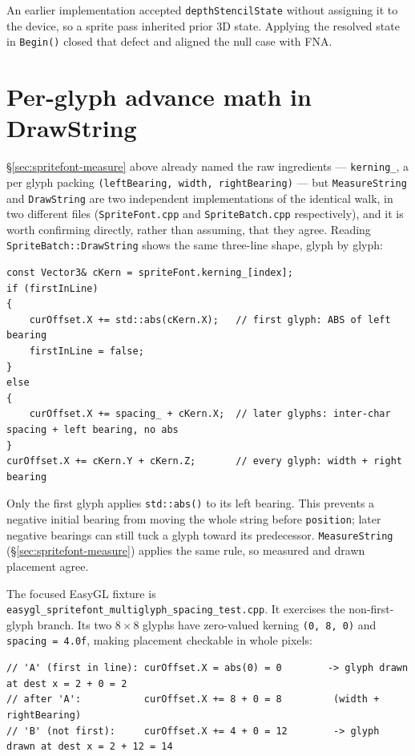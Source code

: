 \begin{historynote}
An earlier implementation accepted \texttt{depthStencilState} without assigning it to the
device, so a sprite pass inherited prior 3D state. Applying the resolved state in
\texttt{Begin()} closed that defect and aligned the null case with FNA.
\end{historynote}

\section{Per-glyph advance math in DrawString}
\label{sec:spritebatch-drawstring-advance}

\S\ref{sec:spritefont-measure} above already named the raw ingredients --- \texttt{kerning\_},
a  per glyph packing \texttt{(leftBearing, width, rightBearing)} --- but
\texttt{MeasureString} and \texttt{DrawString} are two independent implementations of the
identical walk, in two different files (\texttt{SpriteFont.cpp} and \texttt{SpriteBatch.cpp}
respectively), and it is worth confirming directly, rather than assuming, that they agree.
Reading \texttt{SpriteBatch::DrawString} shows the same three-line shape, glyph by glyph:

\begin{lstlisting}
const Vector3& cKern = spriteFont.kerning_[index];
if (firstInLine)
{
    curOffset.X += std::abs(cKern.X);   // first glyph: ABS of left bearing
    firstInLine = false;
}
else
{
    curOffset.X += spacing_ + cKern.X;  // later glyphs: inter-char spacing + left bearing, no abs
}
curOffset.X += cKern.Y + cKern.Z;       // every glyph: width + right bearing
\end{lstlisting}

Only the first glyph applies \texttt{std::abs()} to its left bearing. This prevents a negative
initial bearing from moving the whole string before \texttt{position}; later negative bearings
can still tuck a glyph toward its predecessor. \texttt{MeasureString}
(\S\ref{sec:spritefont-measure}) applies the same rule, so measured and drawn placement agree.

The focused EasyGL fixture is
\texttt{easygl\_spritefont\_multiglyph\_spacing\_test.cpp}. It
exercises the non-first-glyph branch. Its two $8\times8$ glyphs have zero-valued kerning
\texttt{(0, 8, 0)} and \texttt{spacing = 4.0f}, making placement checkable in whole pixels:

\begin{lstlisting}
// 'A' (first in line): curOffset.X = abs(0) = 0        -> glyph drawn at dest x = 2 + 0 = 2
// after 'A':           curOffset.X += 8 + 0 = 8         (width + rightBearing)
// 'B' (not first):     curOffset.X += 4 + 0 = 12        -> glyph drawn at dest x = 2 + 12 = 14
\end{lstlisting}

